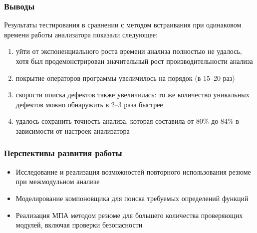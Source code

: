 \documentclass[hyperref={pdfpagelabels=false}]{beamer}
\begin{document}
\begin{frame}[allowframebreaks]
\frametitle{Выводы}
Результаты тестирования в сравнении с методом встраивания при одинаковом времени работы анализатора показали следующее:
\begin{enumerate}
  \item уйти от экспоненциального роста времени анализа полностью не удалось, хотя был продемонстрирован значительный рост производительности анализа
  \item покрытие операторов программы увеличилось на порядок (в 15--20 раз)
  \item скорости поиска дефектов также увеличилась: то же количество уникальных дефектов можно обнаружить в 2--3 раза быстрее
  \item удалось сохранить точность анализа, которая составила от 80\% до 84\% в зависимости от настроек анализатора
\end{enumerate}
\end{frame}
\begin{frame}
\frametitle{Перспективы развития работы}
\begin{itemize}
  \item Исследование и реализация возможностей повторного использования резюме при межмодульном анализе
  \item Моделирование компоновщика для поиска требуемых определений функций
  \item Реализация МПА методом резюме для большего количества проверяющих модулей, включая проверки безопасности
\end{itemize}
\end{frame}
\end{document}
